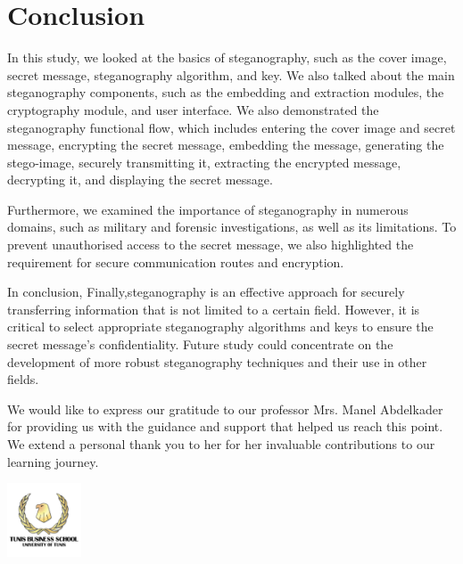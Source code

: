 \chapter{Conclusion}
\begin{center}
In this study, we looked at the basics of steganography, such as the cover image, secret message, steganography algorithm, and key. We also talked about the main steganography components, such as the embedding and extraction modules, the cryptography module, and user interface. We also demonstrated the steganography functional flow, which includes entering the cover image and secret message, encrypting the secret message, embedding the message, generating the stego-image, securely transmitting it, extracting the encrypted message, decrypting it, and displaying the secret message.

Furthermore, we examined the importance of steganography in numerous domains, such as military and forensic investigations, as well as its limitations. To prevent unauthorised access to the secret message, we also highlighted the requirement for secure communication routes and encryption.

In conclusion, Finally,steganography is an effective approach for securely transferring information that is not limited to a certain field. However, it is critical to select appropriate steganography algorithms and keys to ensure the secret message's confidentiality. Future study could concentrate on the development of more robust steganography techniques and their use in other fields.

We would like to express our gratitude to our professor Mrs. Manel Abdelkader for providing us with the guidance and support that helped us reach this point. We extend a personal
thank you to her for her invaluable contributions to our learning journey.
\end{center}
\begin{flushright}
\includegraphics[width=22mm]{figures/tbs.png}
\end{flushright}
